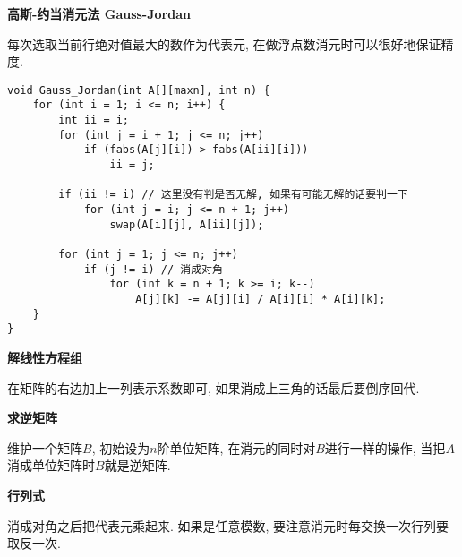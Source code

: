 \textbf{高斯-约当消元法 Gauss-Jordan}

每次选取当前行绝对值最大的数作为代表元, 在做浮点数消元时可以很好地保证精度.

\begin{verbatim}
void Gauss_Jordan(int A[][maxn], int n) {
    for (int i = 1; i <= n; i++) {
        int ii = i;
        for (int j = i + 1; j <= n; j++)
            if (fabs(A[j][i]) > fabs(A[ii][i]))
                ii = j;

        if (ii != i) // 这里没有判是否无解, 如果有可能无解的话要判一下
            for (int j = i; j <= n + 1; j++)
                swap(A[i][j], A[ii][j]);
        
        for (int j = 1; j <= n; j++)
            if (j != i) // 消成对角
                for (int k = n + 1; k >= i; k--)
                    A[j][k] -= A[j][i] / A[i][i] * A[i][k];
    }
}
\end{verbatim}

\textbf{解线性方程组}

在矩阵的右边加上一列表示系数即可, 如果消成上三角的话最后要倒序回代.

\textbf{求逆矩阵}

维护一个矩阵$B$, 初始设为$n$阶单位矩阵, 在消元的同时对$B$进行一样的操作, 当把$A$消成单位矩阵时$B$就是逆矩阵.

\textbf{行列式}

消成对角之后把代表元乘起来. 如果是任意模数, 要注意消元时每交换一次行列要取反一次.